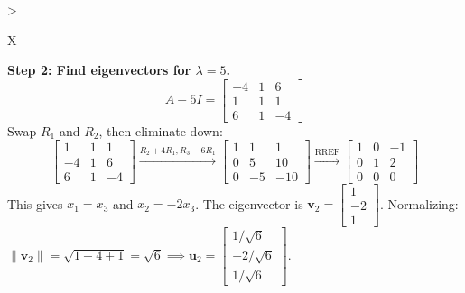 \documentclass[11pt, letterpaper]{article}
\theoremstyle{definition}
\theoremstyle{remark}
\begin{document}
\begin{tabularx}{\textwidth}{>{\raggedright\arraybackslash}X}
\textbf{Step 2: Find eigenvectors for $\lambda = 5$.}
\[ A - 5I = \begin{bmatrix} -4 & 1 & 6 \\ 1 & 1 & 1 \\ 6 & 1 & -4 \end{bmatrix} \]
Swap $R_1$ and $R_2$, then eliminate down:
\[ \begin{bmatrix} 1 & 1 & 1 \\ -4 & 1 & 6 \\ 6 & 1 & -4 \end{bmatrix} \xrightarrow{R_2+4R_1, R_3-6R_1} \begin{bmatrix} 1 & 1 & 1 \\ 0 & 5 & 10 \\ 0 & -5 & -10 \end{bmatrix} \xrightarrow{\text{RREF}} \begin{bmatrix} 1 & 0 & -1 \\ 0 & 1 & 2 \\ 0 & 0 & 0 \end{bmatrix} \]
This gives $x_1 = x_3$ and $x_2 = -2x_3$. The eigenvector is $\mathbf{v}_2 = \begin{bmatrix} 1 \\ -2 \\ 1 \end{bmatrix}$.
Normalizing: $\|\mathbf{v}_2\| = \sqrt{1+4+1} = \sqrt{6} \implies \mathbf{u}_2 = \begin{bmatrix} 1/\sqrt{6} \\ -2/\sqrt{6} \\ 1/\sqrt{6} \end{bmatrix}$.


\end{tabularx}
\end{document}
